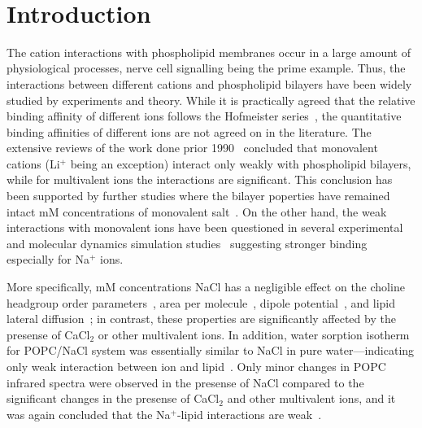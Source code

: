 \documentclass[pre,aps,floatfix,authordate1-4,twocolumn]{revtex4-1}
\begin{document}
~\vspace{0.3cm}\\
{\it \bf} 

\section{Introduction}

The cation interactions with phospholipid membranes occur in a large amount
of physiological processes, nerve cell signalling being the prime example.
Thus, the interactions between different cations and phospholipid bilayers have been widely studied by experiments
and theory. While it is practically agreed that the relative binding affinity of different
ions follows the Hofmeister series~\cite{eisenberg79,cevc90,tocanne90,binder02,celma07,leontidis09,vacha09a,klasczyk10,harb13}, the quantitative binding affinities of different
ions are not agreed on in the literature. The extensive reviews of the work done prior 1990~\cite{cevc90,tocanne90}
concluded that monovalent cations (Li$^+$ being an exception) interact only weakly with phospholipid bilayers, 
while for multivalent ions the interactions are significant. This conclusion has been supported by
further studies where the bilayer poperties have remained intact mM concentrations of monovalent 
salt~\cite{binder02,pabst07,filippov09}. On the other hand, the weak interactions with monovalent ions
have been questioned in several experimental and molecular dynamics simulation 
studies~\cite{bockmann03,bockmann04,vacha09a,manyes05,manyes06,fukuma07,leontidis09,ferber11,morata12,klasczyk10,harb13}
suggesting stronger binding especially for Na$^{+}$ ions.

More specifically, mM concentrations NaCl has a negligible effect on the
choline headgroup order parameters~\cite{akutsu81}, area per molecule~\cite{pabst07}, dipole potential~\cite{clarke99},
and lipid lateral diffusion~\cite{filippov09}; in contrast, these properties are significantly affected by the presense
of CaCl$_2$ or other multivalent ions. In addition, water sorption isotherm for POPC/NaCl system
was essentially similar to NaCl in pure water---indicating only weak interaction between ion and lipid~\cite{binder02}.
Only minor changes in POPC infrared spectra were observed in the presense of NaCl compared to the significant 
changes in the presense of CaCl$_2$ and other multivalent ions, and it was again concluded that the Na$^+$-lipid interactions are weak~\cite{binder02}.
\end{document}
